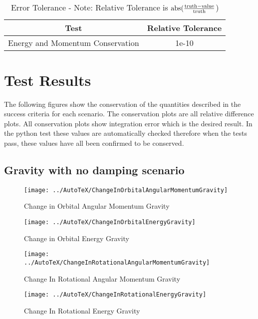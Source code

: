 \begin{table}[htbp]
	\caption{Error Tolerance - Note: Relative Tolerance is $\textnormal{abs}(\frac{\textnormal{truth} - \textnormal{value}}{\textnormal{truth}}$)}
	\label{tab:errortol}
	\centering \fontsize{10}{10}\selectfont
	\begin{tabular}{| c | c |} %
		\hline
		Test   & Relative Tolerance \\
		\hline
		Energy and Momentum Conservation & 1e-10 \\
		\hline	
	\end{tabular}
\end{table}

\clearpage

\section{Test Results}

The following figures show the conservation of the quantities described in the success criteria for each scenario. The conservation plots are all relative difference plots. All conservation plots show integration error which is the desired result. In the python test these values are automatically checked therefore when the tests pass, these values have all been confirmed to be conserved. 

\subsection{Gravity with no damping scenario}
\begin{figure}[htbp]
	\centerline{
		\texttt{[image: ../AutoTeX/ChangeInOrbitalAngularMomentumGravity]}}
	\caption{Change in Orbital Angular Momentum Gravity}
	\label{fig:ChangeInOrbitalAngularMomentumGravity}
\end{figure}
\begin{figure}[htbp]
	\centerline{
		\texttt{[image: ../AutoTeX/ChangeInOrbitalEnergyGravity]}}
	\caption{Change in Orbital Energy Gravity}
	\label{fig:ChangeInOrbitalEnergyGravity}
\end{figure}
\begin{figure}[htbp]
	\centerline{
		\texttt{[image: ../AutoTeX/ChangeInRotationalAngularMomentumGravity]}}
	\caption{Change In Rotational Angular Momentum Gravity}
	\label{fig:ChangeInRotationalAngularMomentumGravity}
\end{figure}
\begin{figure}[htbp]
	\centerline{
		\texttt{[image: ../AutoTeX/ChangeInRotationalEnergyGravity]}}
	\caption{Change In Rotational Energy Gravity}
	\label{fig:ChangeInRotationalEnergyGravity}
\end{figure}
\clearpage

